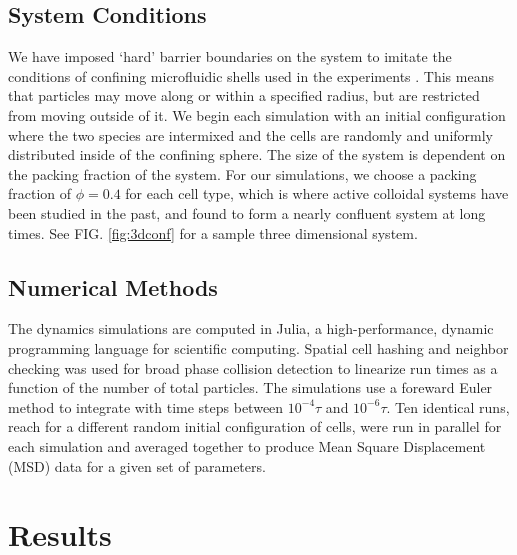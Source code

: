 \documentclass[aps,prb,twocolumn,groupedaddress,nofootinbib,floatfix]{revtex4}
\begin{document}

\subsection*{System Conditions}
We have imposed `hard' barrier boundaries on the system to imitate the conditions of confining microfluidic shells used in the experiments \cite{Mingming}. 
This means that particles may move along or within a specified radius, but are restricted from moving outside of it. We begin each simulation with an initial configuration 
where the two species are intermixed and the cells are randomly and uniformly distributed inside of the confining sphere. The size of the system is dependent on the 
packing fraction of the system. For our simulations, we choose a packing fraction of $\phi=0.4$ for each cell type, which is where active colloidal systems have been 
studied in the past\cite{RednerBaskaran}, and found to form a nearly confluent system at long times. See FIG. \ref{fig:3dconf} for a sample three dimensional system.


\subsection*{Numerical Methods}

The dynamics simulations are computed in Julia, a high-performance, dynamic 
programming language for scientific computing. Spatial cell hashing and neighbor 
checking was used for broad phase collision detection to linearize run times 
as a function of the number of total particles. The simulations use a foreward 
Euler method to integrate with time steps between $10^{-4}\tau$ and $10^{-6}\tau$.
Ten identical runs, reach for a different random initial configuration of cells, were run in parallel for each simulation
and averaged together to produce Mean Square Displacement (MSD) data for a given set of parameters.

\section*{Results}
\end{document}
